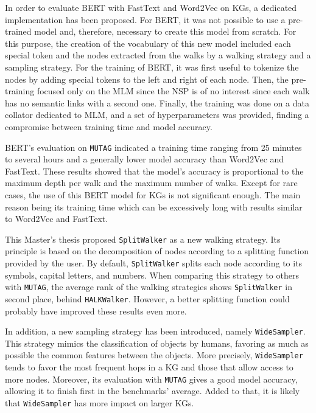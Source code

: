 In order to evaluate BERT with FastText and Word2Vec on KGs, a dedicated
implementation has been proposed. For BERT, it was not possible to use a
pre-trained model and, therefore, necessary to create this model from
scratch. For this purpose, the creation of the vocabulary of this new model
included each special token and the nodes extracted from the walks by a walking
strategy and a sampling strategy. For the training of BERT, it was first useful
to tokenize the nodes by adding special tokens to the left and right of each
node. Then, the pre-training focused only on the MLM since the NSP is of no
interest since each walk has no semantic links with a second one. Finally, the
training was done on a data collator dedicated to MLM, and a set of
hyperparameters was provided, finding a compromise between training time and
model accuracy.

BERT's evaluation on \texttt{MUTAG} indicated a training time ranging from 25
minutes to several hours and a generally lower model accuracy than Word2Vec and
FastText. These results showed that the model's accuracy is proportional to the
maximum depth per walk and the maximum number of walks. Except for rare cases,
the use of this BERT model for KGs is not significant enough. The main reason
being its training time which can be excessively long with results similar to
Word2Vec and FastText.

This Master's thesis proposed \texttt{SplitWalker} as a new walking
strategy. Its principle is based on the decomposition of nodes according to a
splitting function provided by the user. By default, \texttt{SplitWalker} splits
each node according to its symbols, capital letters, and numbers. When comparing
this strategy to others with \texttt{MUTAG}, the average rank of the walking
strategies shows \texttt{SplitWalker} in second place, behind
\texttt{HALKWalker}. However, a better splitting function could probably have
improved these results even more.

In addition, a new sampling strategy has been introduced, namely
\texttt{WideSampler}. This strategy mimics the classification of objects by
humans, favoring as much as possible the common features between the
objects. More precisely, \texttt{WideSampler} tends to favor the most frequent
hops in a KG and those that allow access to more nodes. Moreover, its evaluation
with \texttt{MUTAG} gives a good model accuracy, allowing it to finish first in
the benchmarks' average. Added to that, it is likely that \texttt{WideSampler}
has more impact on larger KGs.


